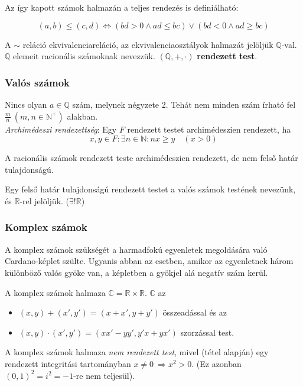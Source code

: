 \documentclass[12pt,margin=0px]{article}
\newcommand\ddfrac[2]{\frac{\displaystyle #1}{\displaystyle #2}}
\newcommand{\N}{\mathbb{N}}
\newcommand{\R}{\mathbb{R}}
\newcommand{\Q}{\mathbb{Q}}
\newcommand{\C}{\mathbb{C}}
\begin{document}
    \noindent Az így kapott számok halmazán a teljes rendezés is definiálható:

    \[
        {\displaystyle \left(a,b\right)\leq \left(c,d\right)\Leftrightarrow (bd>0\wedge ad\leq bc)\vee (bd<0\wedge ad\geq bc)}
    \]

    \noindent A $\sim$ reláció ekvivalenciareláció, az ekvivalenciaosztályok halmazát jelöljük $\Q$-val.\\
    $\Q$ elemeit racionális számoknak nevezzük. $(\Q, +, \cdot)$ \textbf{rendezett test}.

    \subsubsection*{Valós számok\\}

    Nincs olyan $a \in \Q$ szám, melynek négyzete 2. Tehát nem minden szám írható fel $\ddfrac{m}{n}\ (m,n \in \N^+)$ alakban.\\

    \noindent \emph{Archimédeszi rendezettség}: Egy $F$ rendezett testet archimédeszien rendezett, ha
    \[
    x,y\in F: \exists n \in \N : nx \geq y \quad (x>0)
    \]

    \noindent A racionális számok rendezett teste archimédeszien rendezett, de nem felső határ tulajdonságú.

	\noindent Egy felső határ tulajdonságú rendezett testet a valós számok testének nevezünk, és $\R$-rel jelöljük. ($\exists!\R$)

    \subsubsection*{Komplex számok}

    \noindent A komplex számok szükségét a harmadfokú egyenletek megoldására való Cardano-képlet szülte. Ugyanis abban az esetben, amikor az egyenletnek három különböző valós gyöke van, a képletben a gyökjel alá negatív szám kerül.

    \noindent A komplex számok halmaza $\C = \R \times \R$. $\C$ az
	\begin{itemize}[leftmargin=5.5mm]
        \renewcommand{\labelitemi}{$\vcenter{\hbox{\tiny$\bullet$}}$}
        \item $(x,y)+(x',y') = (x+x', y+y')$ összeadással és az
        \item $(x,y)\cdot(x',y') = (xx'-yy', y'x+yx')$ szorzással test.
    \end{itemize}
    A komplex számok halmaza \emph{nem rendezett test}, mivel (tétel alapján) egy rendezett integritási tartományban $ x \neq 0 \ \Rightarrow x^2 > 0$. (Ez azonban $(0,1)^2=i^2 = -1$-re nem teljesül).\\
\end{document}
